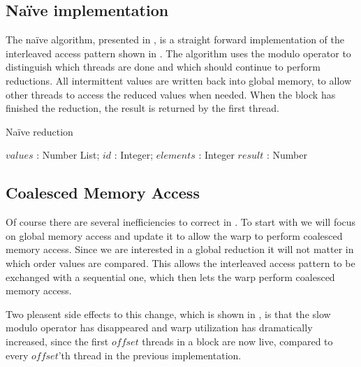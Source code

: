 \subsection{Naïve implementation}

The naïve algorithm, presented in , is a
straight forward implementation of the interleaved access pattern
shown in . The algorithm uses the modulo operator
to distinguish which threads are done and which should continue to
perform reductions. All intermittent values are written back into
global memory, to allow other threads to access the reduced values
when needed. When the block has finished the reduction, the result
is returned by the first thread.

\begin{algorithm}
  \caption{Naïve reduction}
  \label{alg:naiveReduct}
  \begin{algorithmic}
              {$values$ : Number List; $id$ : Integer; $elements$ : Integer}
              {$result$ : Number}
              {
                  \ENDIF
                  \SYNC
                \ENDWHILE
                \ENDIF
              }
  \end{algorithmic}
\end{algorithm}

\subsection{Coalesced Memory Access}

Of course there are several inefficiencies to correct in
. To start with we will focus on global memory access
and update it to allow the warp to perform coalesced memory access. Since we are
interested in a global reduction it will not matter in which order values are
compared. This allows the interleaved access pattern to be exchanged with a
sequential one, which then lets the warp perform coalesced memory access.


Two pleasent side effects to this change, which is shown in
, is that the slow modulo operator has disappeared
and warp utilization has dramatically increased, since the first $offset$
threads in a block are now live, compared to every $offset$'th thread in the
previous implementation.

